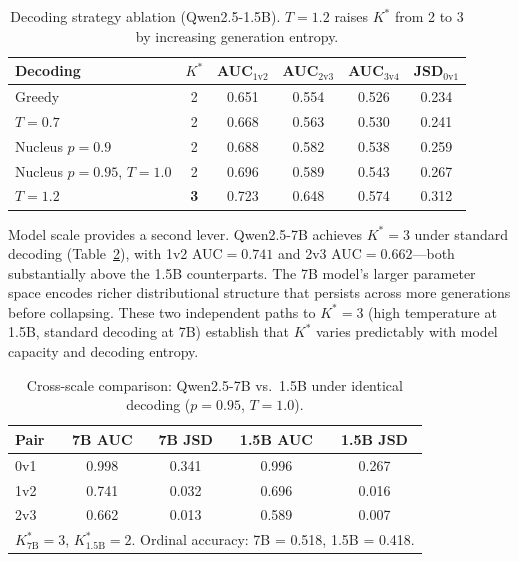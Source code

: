 \documentclass[11pt,a4paper]{article}
\begin{document}
\begin{table}[t]
\centering
\small
\caption{Decoding strategy ablation (Qwen2.5-1.5B). $T{=}1.2$ raises $K^*$ from 2 to 3 by increasing generation entropy.}
\label{tab:decoding}
\begin{tabular}{@{}lccccc@{}}
\toprule
\textbf{Decoding} & \textbf{$K^*$} & \textbf{AUC$_{1\text{v}2}$} & \textbf{AUC$_{2\text{v}3}$} & \textbf{AUC$_{3\text{v}4}$} & \textbf{JSD$_{0\text{v}1}$} \\
\midrule
Greedy & 2 & 0.651 & 0.554 & 0.526 & 0.234 \\
$T{=}0.7$ & 2 & 0.668 & 0.563 & 0.530 & 0.241 \\
Nucleus $p{=}0.9$ & 2 & 0.688 & 0.582 & 0.538 & 0.259 \\
Nucleus $p{=}0.95$, $T{=}1.0$ & 2 & 0.696 & 0.589 & 0.543 & 0.267 \\
$T{=}1.2$ & \textbf{3} & 0.723 & 0.648 & 0.574 & 0.312 \\
\bottomrule
\end{tabular}
\end{table}

Model scale provides a second lever. Qwen2.5-7B achieves $K^*{=}3$ under standard decoding (Table~\ref{tab:7b}), with 1v2 AUC${=}0.741$ and 2v3 AUC${=}0.662$---both substantially above the 1.5B counterparts. The 7B model's larger parameter space encodes richer distributional structure that persists across more generations before collapsing. These two independent paths to $K^*{=}3$ (high temperature at 1.5B, standard decoding at 7B) establish that $K^*$ varies predictably with model capacity and decoding entropy.

\begin{table}[t]
\centering
\small
\caption{Cross-scale comparison: Qwen2.5-7B vs.\ 1.5B under identical decoding ($p{=}0.95$, $T{=}1.0$).}
\label{tab:7b}
\begin{tabular}{@{}lcccc@{}}
\toprule
\textbf{Pair} & \textbf{7B AUC} & \textbf{7B JSD} & \textbf{1.5B AUC} & \textbf{1.5B JSD} \\
\midrule
0v1 & 0.998 & 0.341 & 0.996 & 0.267 \\
1v2 & 0.741 & 0.032 & 0.696 & 0.016 \\
2v3 & 0.662 & 0.013 & 0.589 & 0.007 \\
\bottomrule
\multicolumn{5}{l}{\small $K^*_{\text{7B}} = 3$, $K^*_{\text{1.5B}} = 2$. Ordinal accuracy: 7B = 0.518, 1.5B = 0.418.}
\end{tabular}
\end{table}
\end{document}
